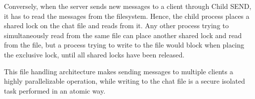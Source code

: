 Conversely, when the server sends new messages to a client through Child SEND, it has to read the messages from the filesystem. Hence, the child process places a shared lock on the chat file and reads from it. Any other process trying to simultaneously read from the same file can place another shared lock and read from the file, but a process trying to write to the file would block when placing the exclusive lock, until all shared locks have been released. 

This file handling architecture makes sending messages to multiple clients a highly parallelizable operation, while writing to the chat file is a secure isolated task performed in an atomic way.

%
%
%
